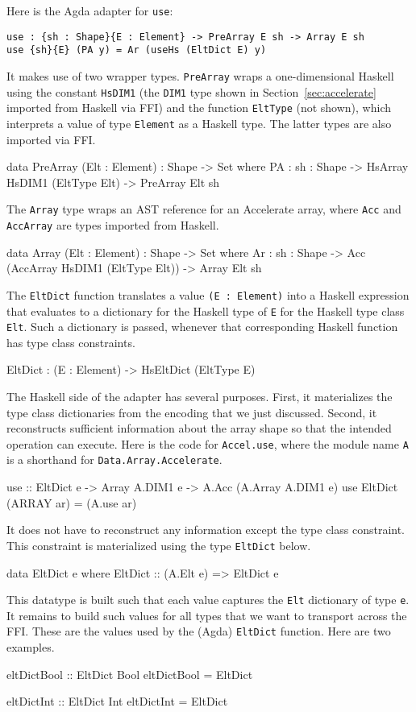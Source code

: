 \documentclass{llncs}
\begin{document}
Here is the Agda adapter for \texttt{use}:
\begin{verbatim}
use : {sh : Shape}{E : Element} -> PreArray E sh -> Array E sh
use {sh}{E} (PA y) = Ar (useHs (EltDict E) y)
\end{verbatim}
It makes use of two wrapper types. \texttt{PreArray} wraps a
one-dimensional Haskell using the constant \texttt{HsDIM1} (the
\texttt{DIM1} type shown in Section~\ref{sec:accelerate} imported from
Haskell via FFI) and the function \texttt{EltType} (not shown), which
interprets a value of type \texttt{Element} as a Haskell type. The
latter types are also imported via FFI.
\begin{code}
data PreArray (Elt : Element) : Shape -> Set where
  PA : {sh : Shape}
     -> HsArray HsDIM1 (EltType Elt) -> PreArray Elt sh
\end{code}
The \texttt{Array} type wraps an AST reference for an Accelerate
array, where \texttt{Acc} and \texttt{AccArray} are types imported
from Haskell.
\begin{code}
data Array (Elt : Element) : Shape -> Set where
  Ar : {sh : Shape}
     -> Acc (AccArray HsDIM1 (EltType Elt)) -> Array Elt sh
\end{code}
The \texttt{EltDict} function translates a value 
\texttt{(E : Element)} into a Haskell expression that evaluates to a
dictionary for the Haskell type of \texttt{E} for the Haskell type
class \texttt{Elt}. Such a dictionary is passed, whenever that
corresponding Haskell function has type class constraints.
\begin{code}
EltDict : (E : Element) -> HsEltDict (EltType E)
\end{code}

The Haskell side of the adapter has several purposes. First, it
materializes the type class dictionaries from the encoding that we
just discussed. Second, it reconstructs sufficient information about
the array shape so that the intended operation can execute. Here is
the code for \texttt{Accel.use}, where the module name \texttt{A}
is a shorthand for \texttt{Data.Array.Accelerate}.
\begin{hcode}
use :: EltDict e -> Array A.DIM1 e -> A.Acc (A.Array A.DIM1 e)
use EltDict (ARRAY ar) = (A.use ar)
\end{hcode}
It does not have to reconstruct any information except the type class
constraint. This constraint is materialized using the type
\texttt{EltDict} below.
\begin{hcode}
data EltDict e where
  EltDict :: (A.Elt e) => EltDict e
\end{hcode}
This datatype is built such that each value captures the \texttt{Elt}
dictionary of type \texttt{e}. It remains to build such values for all
types that we want to transport across the FFI. These are the values
used by the (Agda) \texttt{EltDict} function. Here are two examples.
\begin{hcode}
eltDictBool :: EltDict Bool
eltDictBool = EltDict

eltDictInt :: EltDict Int
eltDictInt = EltDict
\end{hcode}
\end{document}

